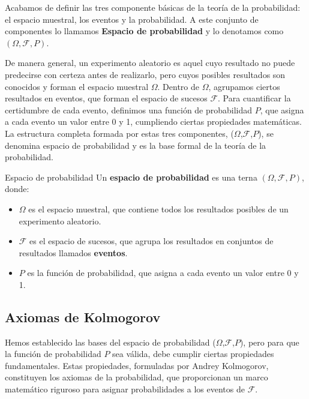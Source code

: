 Acabamos de definir las tres componente básicas de la teoría de la probabilidad: el espacio muestral, los eventos y la probabilidad. A este
conjunto de componentes lo llamamos \textbf{Espacio de probabilidad} y lo denotamos como $(\Omega, \mathcal{F}, P)$.

De manera general, un experimento aleatorio es aquel cuyo resultado no puede predecirse con certeza antes de realizarlo, pero cuyos posibles resultados son conocidos y forman el espacio muestral $\Omega$. Dentro de $\Omega$, agrupamos ciertos resultados en eventos, que forman el espacio de sucesos $\mathcal{F}$. Para cuantificar la certidumbre de cada evento, definimos una función de probabilidad $P$, que asigna a cada evento un valor entre 0 y 1, cumpliendo ciertas propiedades matemáticas. La estructura completa formada por estas tres componentes, ($\Omega$,$\mathcal{F}$,$P$), se denomina espacio de probabilidad y es la base formal de la teoría de la probabilidad.

\begin{definicion}{Espacio de probabilidad}
Un \textbf{espacio de probabilidad} es una terna $(\Omega, \mathcal{F}, P)$, donde:

\begin{itemize}
    \item $\Omega$ es el espacio muestral, que contiene todos los resultados posibles de un experimento aleatorio.
    \item $\mathcal{F}$ es el espacio de sucesos, que agrupa los resultados en conjuntos de resultados llamados \textbf{eventos}.
    \item $P$ es la función de probabilidad, que asigna a cada evento un valor entre 0 y 1.
\end{itemize}
\end{definicion}

\subsection{Axiomas de Kolmogorov}

Hemos establecido las bases del espacio de probabilidad ($\Omega$,$\mathcal{F}$,$P$), pero para que la función de probabilidad $P$ sea válida, debe cumplir ciertas propiedades fundamentales. Estas propiedades, formuladas por Andrey Kolmogorov, constituyen los axiomas de la probabilidad, que proporcionan un marco matemático riguroso para asignar probabilidades a los eventos de $\mathcal{F}$.

